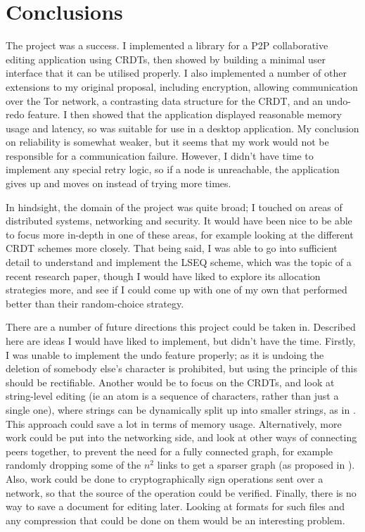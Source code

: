 \documentclass[diss.tex]{subfiles}
\begin{document}
\chapter{Conclusions}
\label{chap:conclusions}
The project was a success. I implemented a library for a P2P collaborative editing application using CRDTs, then showed by building a minimal user interface that it can be utilised properly. I also implemented a number of other extensions to my original proposal, including encryption, allowing communication over the Tor network, a contrasting data structure for the CRDT, and an undo-redo feature. I then showed that the application displayed reasonable memory usage and latency, so was suitable for use in a desktop application. My conclusion on reliability is somewhat weaker, but it seems that my work would not be responsible for a communication failure. However, I didn't have time to implement any special retry logic, so if a node is unreachable, the application gives up and moves on instead of trying more times.

In hindsight, the domain of the project was quite broad; I touched on areas of distributed systems, networking and security. It would have been nice to be able to focus more in-depth in one of these areas, for example looking at the different CRDT schemes more closely. That being said, I was able to go into sufficient detail to understand and implement the LSEQ scheme, which was the topic of a recent research paper, though I would have liked to explore its allocation strategies more, and see if I could come up with one of my own that performed better than their random-choice strategy.

There are a number of future directions this project could be taken in. Described here are ideas I would have liked to implement, but didn't have the time. Firstly, I was unable to implement the undo feature properly; as it is undoing the deletion of somebody else's character is prohibited, but using the principle of \cite{logootundo} this should be rectifiable. Another would be to focus on the CRDTs, and look at string-level editing (ie an atom is a sequence of characters, rather than just a single one), where strings can be dynamically split up into smaller strings, as in \cite{stringed}. This approach could save a lot in terms of memory usage. Alternatively, more work could be put into the networking side, and look at other ways of connecting peers together, to prevent the need for a fully connected graph, for example randomly dropping some of the $n^2$ links to get a sparser graph (as proposed in \cite{spray}). Also, work could be done to cryptographically sign operations sent over a network, so that the source of the operation could be verified. Finally, there is no way to save a document for editing later. Looking at formats for such files and any compression that could be done on them would be an interesting problem.
\end{document}
